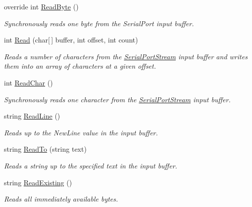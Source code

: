 \begin{DoxyCompactItemize}
override int \mbox{\hyperlink{class_r_j_c_p_1_1_i_o_1_1_ports_1_1_serial_port_stream_a1cb47a9fdfcd3a52c715385f774fc43a}{Read\+Byte}} ()
\begin{DoxyCompactList}\small\item\em Synchronously reads one byte from the Serial\+Port input buffer. \end{DoxyCompactList}\item 
int \mbox{\hyperlink{class_r_j_c_p_1_1_i_o_1_1_ports_1_1_serial_port_stream_ade326529332cadf15ab22992f5f2729d}{Read}} (char\mbox{[}$\,$\mbox{]} buffer, int offset, int count)
\begin{DoxyCompactList}\small\item\em Reads a number of characters from the \mbox{\hyperlink{class_r_j_c_p_1_1_i_o_1_1_ports_1_1_serial_port_stream}{Serial\+Port\+Stream}} input buffer and writes them into an array of characters at a given offset. \end{DoxyCompactList}\item 
int \mbox{\hyperlink{class_r_j_c_p_1_1_i_o_1_1_ports_1_1_serial_port_stream_af756a8f941088f1509b99fefcf7ecdcb}{Read\+Char}} ()
\begin{DoxyCompactList}\small\item\em Synchronously reads one character from the \mbox{\hyperlink{class_r_j_c_p_1_1_i_o_1_1_ports_1_1_serial_port_stream}{Serial\+Port\+Stream}} input buffer. \end{DoxyCompactList}\item 
string \mbox{\hyperlink{class_r_j_c_p_1_1_i_o_1_1_ports_1_1_serial_port_stream_a836874d988f8a551e7a7f7f807c366d3}{Read\+Line}} ()
\begin{DoxyCompactList}\small\item\em Reads up to the New\+Line value in the input buffer. \end{DoxyCompactList}\item 
string \mbox{\hyperlink{class_r_j_c_p_1_1_i_o_1_1_ports_1_1_serial_port_stream_a083926914c8855489f5bdcbd0bc3a78c}{Read\+To}} (string text)
\begin{DoxyCompactList}\small\item\em Reads a string up to the specified {\itshape text} in the input buffer. \end{DoxyCompactList}\item 
string \mbox{\hyperlink{class_r_j_c_p_1_1_i_o_1_1_ports_1_1_serial_port_stream_a0009a74b2a1520a628db0e4ddc3483da}{Read\+Existing}} ()
\begin{DoxyCompactList}\small\item\em Reads all immediately available bytes. \end{DoxyCompactList}\item 

\end{DoxyCompactItemize}

